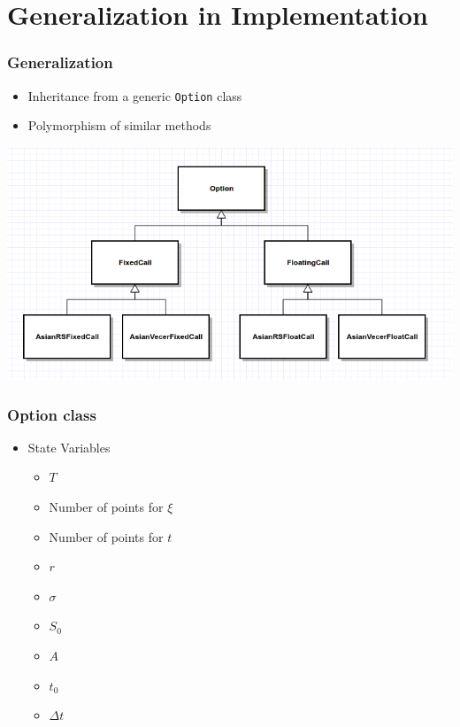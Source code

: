 \documentclass{beamer}
\begin{document}
  \section{Generalization in Implementation}
  \begin{frame}
    \frametitle{Generalization}
    \begin{itemize}
     \item Inheritance from a generic \texttt{Option} class
     \item Polymorphism of similar methods
    \end{itemize}
    \includegraphics[width=\textwidth]{class_diagram}
  \end{frame}
  
  \begin{frame}
    \frametitle{Option class}
    \begin{itemize}
      \item State Variables
      \begin{itemize}
        \item \(T\)
        \item Number of points for \(\xi\)
        \item Number of points for \(t\)
        \item \(r\)
        \item \(\sigma\)
        \item \(S_0\)
        \item \(A\)
        \item \(t_0\)
        \item \(\Delta t\)
      \end{itemize}
    \end{itemize}
  \end{frame}
  
\end{document}
